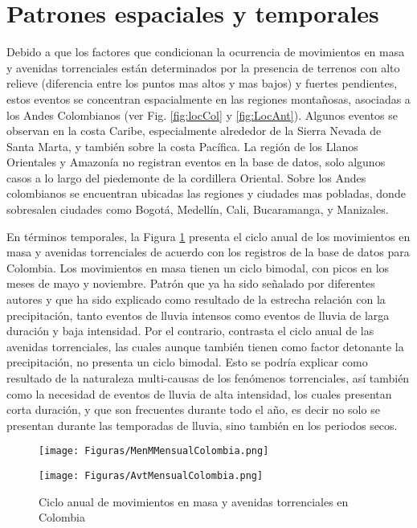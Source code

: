 \documentclass{article}
\begin{document}
\section{Patrones espaciales y temporales}
Debido a que los factores que condicionan la ocurrencia de movimientos en masa y avenidas torrenciales están determinados por la presencia de terrenos con alto relieve (diferencia entre los puntos mas altos y mas bajos) y fuertes pendientes, estos eventos se concentran espacialmente en las regiones montañosas, asociadas a los Andes Colombianos (ver Fig. \ref{fig:locCol} y \ref{fig:LocAnt}). Algunos eventos se observan en la costa Caribe, especialmente alrededor de la Sierra Nevada de Santa Marta, y también sobre la costa Pacífica. La región de los Llanos Orientales y Amazonía no registran eventos en la base de datos, solo algunos casos a lo largo del piedemonte de la cordillera Oriental. Sobre los Andes colombianos se encuentran ubicadas las regiones y ciudades mas pobladas, donde sobresalen ciudades como Bogotá, Medellín, Cali, Bucaramanga, y Manizales.

En términos temporales, la Figura \ref{fig:CicloAnual} presenta el ciclo anual de los movimientos en masa y avenidas torrenciales de acuerdo con los registros de la base de datos para Colombia. Los movimientos en masa tienen un ciclo bimodal, con picos en los meses de mayo y noviembre. Patrón que ya ha sido señalado por diferentes autores \cite{aristizabal2007inventario, aristizabal2020spatial} y que ha sido explicado como resultado de la estrecha relación con la precipitación, tanto eventos de lluvia intensos como eventos de lluvia de larga duración y baja intensidad. Por el contrario, contrasta el ciclo anual de las avenidas torrenciales, las cuales aunque también tienen como factor detonante la precipitación, no presenta un ciclo bimodal. Esto se podría explicar como resultado de la naturaleza multi-causas de los fenómenos torrenciales, así también como la necesidad de eventos de lluvia de alta intensidad, los cuales presentan corta duración, y que son frecuentes durante todo el año, es decir no solo se presentan durante las temporadas de lluvia, sino también en los periodos secos.

\begin{figure}[ht!]
  \begin{minipage}{.48\linewidth}
    \centering
      {\texttt{[image: Figuras/MenMMensualColombia.png]}}
  \end{minipage}\quad
  \begin{minipage}{.48\linewidth}
    \centering
      {\texttt{[image: Figuras/AvtMensualColombia.png]}}
  \end{minipage}
    \caption{Ciclo anual de movimientos en masa y avenidas torrenciales en Colombia}
    \label{fig:CicloAnual}
\end{figure}
\end{document}
